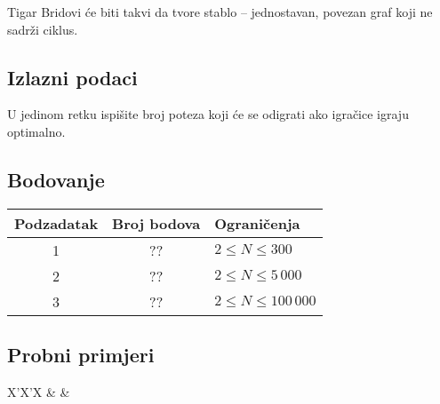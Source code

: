 \begin{statement}[
  problempoints=100,
  timelimit=3 sekunde,
  memorylimit=512 MiB,
]{Tigar}
Bridovi će biti takvi da tvore stablo -- jednostavan, povezan graf koji ne
sadrži ciklus.

\subsection*{Izlazni podaci}

U jedinom retku ispišite broj poteza koji će se odigrati ako igračice igraju
optimalno.

\subsection*{Bodovanje}

{\renewcommand{\arraystretch}{1.4}
  \setlength{\tabcolsep}{6pt}
  \begin{tabular}{ccl}
   Podzadatak & Broj bodova & Ograničenja \\ \midrule
    1 & ?? & $2 \le N \le 300$ \\
    2 & ?? & $2 \le N \le 5\,000$ \\
    3 & ?? & $2 \le N \le 100\,000$
\end{tabular}}

\subsection*{Probni primjeri}
\begin{tabularx}{\textwidth}{X'X'X}
 &
 &
\end{tabularx}

\end{statement}

